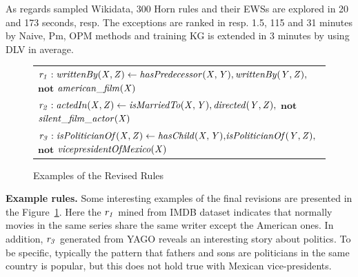 As regards sampled Wikidata, 300 Horn rules and their EWSs are explored in 20 and 173 seconds, resp. The exceptions are ranked in resp. 1.5, 115 and 31 minutes by Naive, Pm, OPM methods and training KG is extended in 3 minutes by using DLV in average.

\begin{figure}[t]
    \centering
   
    \vspace{-.2cm}
    \begin{tabular}{l}
 {\scriptsize
        $\mathit{r_1: writtenBy(X, Z)}  \leftarrow
        \mathit{hasPredecessor(X, Y)},\mathit{writtenBy(Y, Z)},$ $ \textbf{not}$  $\mathit{american\_film(X)} $}\\        
       {\scriptsize 
$\mathit{r_2:  actedIn(X, Z)}  \leftarrow
        \mathit{isMarriedTo(X, Y)},\mathit{directed(Y, Z)},$ $ \textbf{not}$  $\mathit{silent\_film\_actor(X)} $} \\
          {\scriptsize 
$\mathit{r_3:  isPoliticianOf(X, Z)}  \leftarrow
        \mathit{hasChild(X, Y)}{,}\mathit{isPoliticianOf(Y, Z)}{,}$$ \textbf{not}$  $\mathit{vicepresidentOfMexico(X)} $} \\
 \end{tabular}            
    \caption{Examples of the Revised Rules}
 \label{fig:examplerules}
 \vspace{-.4cm}
\end{figure}

\textbf{Example rules.} Some interesting examples of the final revisions are presented in the Figure~\ref{fig:examplerules}. Here 
the $\mathit{r_1}$ mined from IMDB dataset indicates that normally movies in the same series share the same writer except the American ones. In addition, $\mathit{r_3}$ generated from YAGO reveals an interesting story about politics. To be specific, typically  the pattern that fathers and sons are politicians in the same country is popular, but this does not hold true with Mexican vice-presidents.